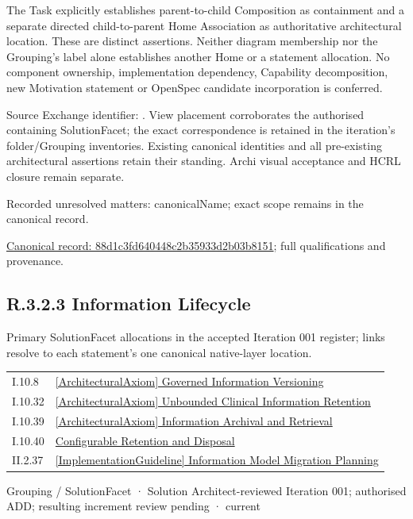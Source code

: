 The Task explicitly establishes parent-to-child Composition as containment and
a separate directed child-to-parent Home Association as authoritative architectural
location. These are distinct assertions. Neither diagram membership nor the
Grouping's label alone establishes another Home or a statement allocation.
No component ownership, implementation dependency, Capability decomposition,
new Motivation statement or OpenSpec candidate incorporation is conferred.



Source Exchange identifier: \texttt{}. View placement corroborates
the authorised containing SolutionFacet; the exact correspondence is retained in the
iteration's folder/Grouping inventories. Existing canonical identities and all
pre-existing architectural assertions retain their standing. Archi visual
acceptance and HCRL closure remain separate.


{\small Recorded unresolved matters: canonicalName; exact scope remains in the canonical record.}\par
{\footnotesize \href{../../../../../../../continuum/grouping/88d1c3fd640448c2b35933d2b03b8151.md}{Canonical record: 88d1c3fd640448c2b35933d2b03b8151}; full qualifications and provenance.}\par
\subsection*{R.3.2.3 Information Lifecycle}
\label{navigation:R.3.2.3}

Primary SolutionFacet allocations in the accepted Iteration 001 register; links resolve to each statement’s one canonical native-layer location.\par
\begin{longtable}{p{.22\linewidth}p{.73\linewidth}}
I.10.8 & \hyperref[element:2bd0132f072b42e9bf71bf483eb2deec]{[ArchitecturalAxiom] Governed Information Versioning} \\
I.10.32 & \hyperref[element:4c270732fecf4e79bb83c938861ce05b]{[ArchitecturalAxiom] Unbounded Clinical Information Retention} \\
I.10.39 & \hyperref[element:2429db4dbecc4a03a66f5189d76a6c38]{[ArchitecturalAxiom] Information Archival and Retrieval} \\
I.10.40 & \hyperref[element:b1a46fce85b4448fba55987af146d61e]{Configurable Retention and Disposal} \\
II.2.37 & \hyperref[element:4a2cd91fab0c42e98b09a017aefa66de]{[ImplementationGuideline] Information Model Migration Planning} \\
\end{longtable}
\label{element:b23f7fa8cb1b46569f63bde1aa5fbf1f}
{\small Grouping / SolutionFacet · Solution Architect-reviewed Iteration 001; authorised ADD; resulting increment review pending · current}\par

